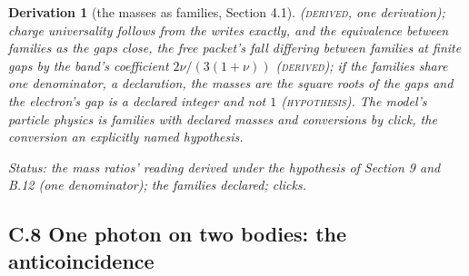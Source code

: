 \documentclass[pdflatex,sn-mathphys-num]{sn-jnl}
\newcommand{\claimmark}[1]{\textup{\textsc{#1}}}
\theoremstyle{thmstyleone}
\newtheorem{derivation}{Derivation}
\begin{document}
\begin{derivation}[the masses as families, Section 4.1]
(\claimmark{derived}, one derivation); charge universality follows from the writes exactly, and the equivalence between families as the gaps close, the free packet's fall differing between families at finite gaps by the band's coefficient $2\nu / (3(1 + \nu))$ (\claimmark{derived}); if the families share one denominator, a declaration, the masses are the square roots of the gaps and the electron's gap is a declared integer and not $1$ (\claimmark{hypothesis}). The model's particle physics is families with declared masses and conversions by click, the conversion an explicitly named hypothesis.

\emph{Status:} the mass ratios' reading derived under the hypothesis of Section 9 and B.12 (one denominator); the families declared; clicks.
\end{derivation}


\subsection*{C.8 One photon on two bodies: the anticoincidence}
\end{document}
